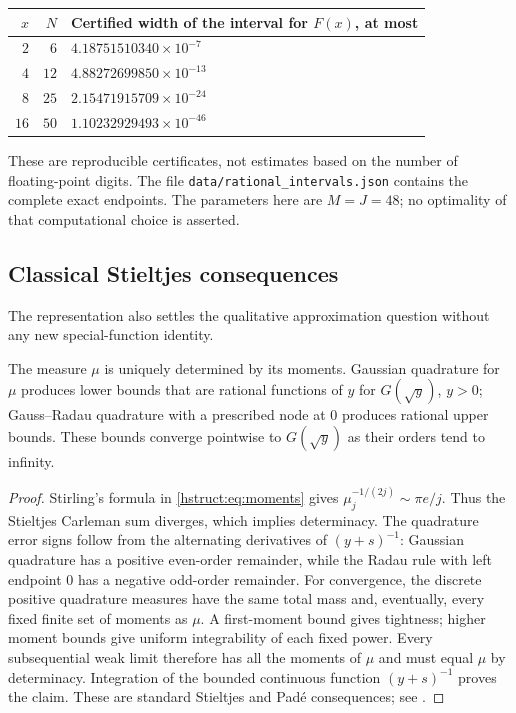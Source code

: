 \begin{center}
\begin{tabular}{rrl}
\toprule
$x$ & $N$ & Certified width of the interval for $F(x)$, at most\\
\midrule
$2$  & $6$  & $4.18751510340\times10^{-7}$\\
$4$  & $12$ & $4.88272699850\times10^{-13}$\\
$8$  & $25$ & $2.15471915709\times10^{-24}$\\
$16$ & $50$ & $1.10232929493\times10^{-46}$\\
\bottomrule
\end{tabular}
\end{center}
These are reproducible certificates, not estimates based on the number
of floating-point digits. The file
\texttt{data/rational\_intervals.json} contains the complete exact
endpoints. The parameters here are $M=J=48$; no optimality of that
computational choice is asserted.

\subsection{Classical Stieltjes consequences}

The representation also settles the qualitative approximation question
without any new special-function identity.

\begin{proposition}
\label{hstruct:prop:Stieltjes}
The measure $\mu$ is uniquely determined by its moments. Gaussian
quadrature for $\mu$ produces lower bounds that are rational functions of $y$ for
$G(\sqrt y)$, $y>0$; Gauss--Radau quadrature with a prescribed node at
$0$ produces rational upper bounds. These bounds converge pointwise to
$G(\sqrt y)$ as their orders tend to infinity.
\end{proposition}
\begin{proof}
Stirling's formula in \eqref{hstruct:eq:moments} gives
$\mu_j^{-1/(2j)}\sim\pi e/j$. Thus the Stieltjes Carleman sum
diverges, which implies determinacy. The quadrature error signs follow
from the alternating derivatives of $(y+s)^{-1}$: Gaussian
quadrature has a positive even-order remainder, while the Radau rule
with left endpoint $0$ has a negative odd-order remainder.
For convergence, the discrete positive quadrature measures have the
same total mass and, eventually, every fixed finite set of moments as
$\mu$. A first-moment bound gives tightness; higher moment bounds give
uniform integrability of each fixed power. Every subsequential weak
limit therefore has all the moments of $\mu$ and must equal $\mu$ by
determinacy. Integration of the bounded continuous function
$(y+s)^{-1}$ proves the claim. These are standard Stieltjes and Pad\'e
consequences; see \cite{hstruct:Simon}.
\end{proof}

